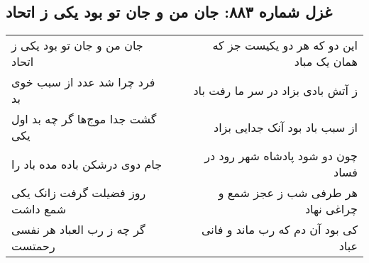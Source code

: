 \begin{center}
\section*{غزل شماره ۸۸۳: جان من و جان تو بود یکی ز اتحاد}
\label{sec:0883}
\begin{longtable}{l p{0.5cm} r}
جان من و جان تو بود یکی ز اتحاد
&&
این دو که هر دو یکیست جز که همان یک مباد
\\
فرد چرا شد عدد از سبب خوی بد
&&
ز آتش بادی بزاد در سر ما رفت باد
\\
گشت جدا موج‌ها گر چه بد اول یکی
&&
از سبب باد بود آنک جدایی بزاد
\\
جام دوی درشکن باده مده باد را
&&
چون دو شود پادشاه شهر رود در فساد
\\
روز فضیلت گرفت زانک یکی شمع داشت
&&
هر طرفی شب ز عجز شمع و چراغی نهاد
\\
گر چه ز رب العباد هر نفسی رحمتست
&&
کی بود آن دم که رب ماند و فانی عباد
\\
\end{longtable}
\end{center}
